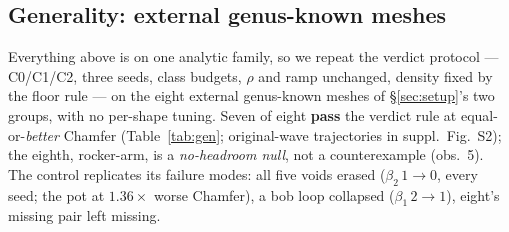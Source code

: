 \subsection{Generality: external genus-known meshes}
\label{sec:generality}
Everything above is on one analytic family, so we repeat the verdict
protocol --- C0/C1/C2, three seeds, class budgets, $\rho$ and ramp
unchanged, density fixed by the floor rule --- on the eight external
genus-known meshes of \S\ref{sec:setup}'s two groups, with no
per-shape tuning.
Seven of eight \textbf{pass} the verdict rule at equal-or-\emph{better}
Chamfer (Table~\ref{tab:gen}; original-wave trajectories in suppl.\
Fig.~S2); the eighth, rocker-arm, is a \emph{no-headroom null}, not a
counterexample (obs.~5). The control replicates its failure modes: all
five voids erased ($\beta_2\,1{\to}0$, every seed; the pot at
$1.36\times$ worse Chamfer), a bob loop collapsed ($\beta_1\,2{\to}1$),
eight's missing pair left missing.

